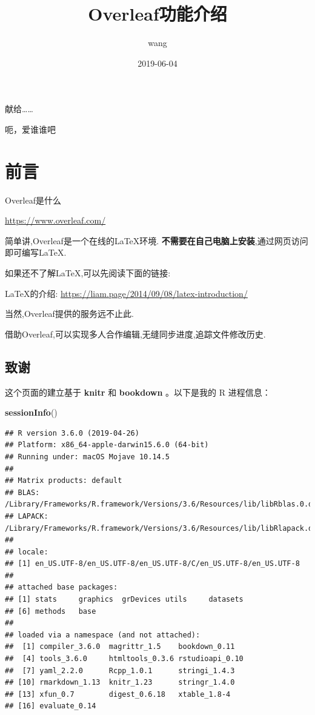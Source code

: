 \documentclass[]{ctexbook}
\title{Overleaf功能介绍}
\author{wang}
\date{2019-06-04}
\newenvironment{Shaded}{\begin{snugshade}}{\end{snugshade}}
\newcommand{\KeywordTok}[1]{\textcolor[rgb]{0.13,0.29,0.53}{\textbf{#1}}}
\newcommand{\NormalTok}[1]{#1}
\begin{document}
\maketitle


\thispagestyle{empty}

\begin{center}
献给……

呃，爱谁谁吧
\end{center}

\setlength{\abovedisplayskip}{-5pt}
\setlength{\abovedisplayshortskip}{-5pt}

{
\setcounter{tocdepth}{2}
\tableofcontents
}
\listoftables
\listoffigures
\hypertarget{section}{%
\chapter*{前言}\label{section}}


Overleaf是什么

\url{https://www.overleaf.com/}

简单讲,Overleaf是一个在线的LaTeX环境.
\textbf{不需要在自己电脑上安装},通过网页访问即可编写LaTeX.

如果还不了解LaTeX,可以先阅读下面的链接:

LaTeX的介绍:
\url{https://liam.page/2014/09/08/latex-introduction/}

当然,Overleaf提供的服务远不止此.

借助Overleaf,可以实现多人合作编辑,无缝同步进度,追踪文件修改历史.

\hypertarget{section-1}{%
\section*{致谢}\label{section-1}}


这个页面的建立基于 \textbf{knitr} \citep{xie2015} 和 \textbf{bookdown} \citep{R-bookdown}。以下是我的 R 进程信息：

\begin{Shaded}
\begin{Highlighting}[]
\KeywordTok{sessionInfo}\NormalTok{()}
\end{Highlighting}
\end{Shaded}

\begin{verbatim}
## R version 3.6.0 (2019-04-26)
## Platform: x86_64-apple-darwin15.6.0 (64-bit)
## Running under: macOS Mojave 10.14.5
## 
## Matrix products: default
## BLAS:   /Library/Frameworks/R.framework/Versions/3.6/Resources/lib/libRblas.0.dylib
## LAPACK: /Library/Frameworks/R.framework/Versions/3.6/Resources/lib/libRlapack.dylib
## 
## locale:
## [1] en_US.UTF-8/en_US.UTF-8/en_US.UTF-8/C/en_US.UTF-8/en_US.UTF-8
## 
## attached base packages:
## [1] stats     graphics  grDevices utils     datasets 
## [6] methods   base     
## 
## loaded via a namespace (and not attached):
##  [1] compiler_3.6.0  magrittr_1.5    bookdown_0.11  
##  [4] tools_3.6.0     htmltools_0.3.6 rstudioapi_0.10
##  [7] yaml_2.2.0      Rcpp_1.0.1      stringi_1.4.3  
## [10] rmarkdown_1.13  knitr_1.23      stringr_1.4.0  
## [13] xfun_0.7        digest_0.6.18   xtable_1.8-4   
## [16] evaluate_0.14
\end{verbatim}
\end{document}
